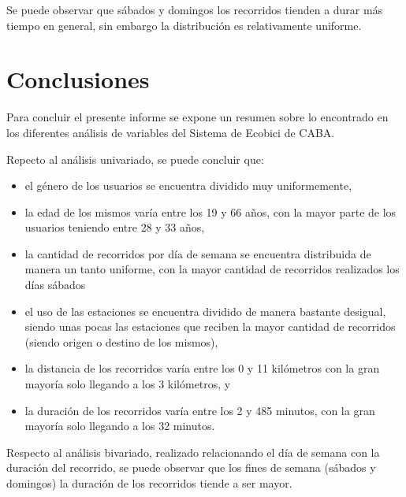 \documentclass[11pt]{article}
\begin{document}
    Se puede observar que s\'abados y domingos los recorridos tienden a durar m\'as tiempo en general, sin embargo la distribuci\'on es relativamente uniforme.

    \section{Conclusiones}
    Para concluir el presente informe se expone un resumen sobre lo encontrado en los diferentes an\'alisis de variables del Sistema de Ecobici de CABA.

    Repecto al an\'alisis univariado, se puede concluir que: 
    \begin{itemize}
      \item el g\'enero de los usuarios se encuentra dividido muy uniformemente, 
      \item la edad de los mismos var\'ia entre los 19 y 66 años, con la mayor parte de los usuarios teniendo entre 28 y 33 años,
      \item la cantidad de recorridos por d\'ia de semana se encuentra distribuida de manera un tanto uniforme, con la mayor cantidad de recorridos realizados los d\'ias s\'abados
      \item el uso de las estaciones se encuentra dividido de manera bastante desigual, siendo unas pocas las estaciones que reciben la mayor cantidad de recorridos (siendo origen o destino de los mismos),
      \item la distancia de los recorridos var\'ia entre los 0 y 11 kilómetros con la gran mayor\'ia solo llegando a los 3 kil\'ometros, y
      \item la duraci\'on de los recorridos var\'ia entre los 2 y 485 minutos, con la gran mayor\'ia solo llegando a los 32 minutos.
    \end{itemize}
      
    Respecto al an\'alisis bivariado, realizado relacionando el d\'ia de semana con la duraci\'on del recorrido, se puede observar que los fines de semana (s\'abados y domingos) la duraci\'on de los recorridos tiende a ser mayor. 
\end{document}
